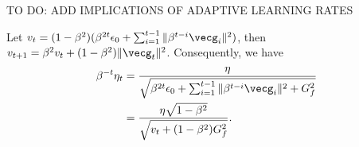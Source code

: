 TO DO: ADD IMPLICATIONS OF ADAPTIVE LEARNING RATES

Let $v_t = (1-\beta^2)(\beta^{2t}\epsilon_0 + \sum_{i=1}^{t-1}\|\beta^{t-i}\vecg_i\|^2)$, then $v_{t+1} = \beta^2v_t + (1-\beta^2)\|\vecg_t\|^2$. Consequently, we have
\begin{align*}
    \beta^{-t}\eta_t 
    &= \frac{\eta}{\sqrt{\beta^{2t}\epsilon_0 + \sum_{i=1}^{t-1}\|\beta^{t-i}\vecg_i\|^2 + G_f^2}} \\
    &= \frac{\eta\sqrt{1-\beta^2}}{\sqrt{v_t + (1-\beta^2)G_f^2}}.
\end{align*}
